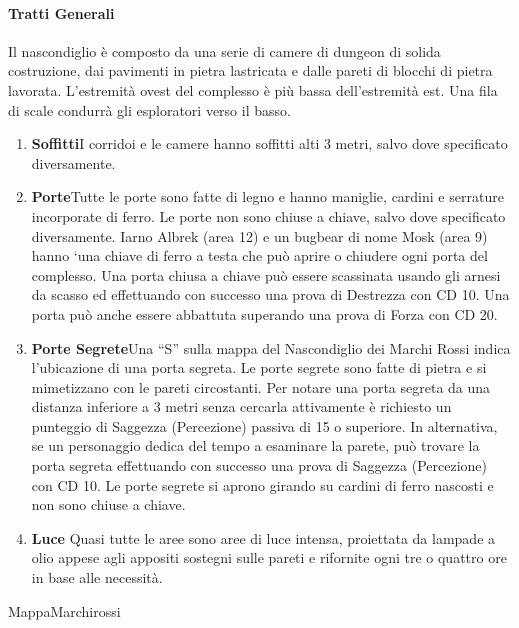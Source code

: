 \documentclass{article}
\begin{document}
\paragraph{Tratti Generali}
\hypertarget{trattigen}{}
Il nascondiglio è composto da una serie di camere di dungeon
di solida costruzione, dai pavimenti in pietra lastricata e
dalle pareti di blocchi di pietra lavorata. L'estremità ovest
del complesso è più bassa dell’estremità est. Una fila di scale
condurrà gli esploratori verso il basso.
\begin{enumerate}
    \item \textbf{Soffitti}I corridoi e le camere hanno soffitti alti 3 metri,
salvo dove specificato diversamente.
    \item \textbf{Porte}Tutte le porte sono fatte di legno e hanno maniglie,
cardini e serrature incorporate di ferro. Le porte non sono
chiuse a chiave, salvo dove specificato diversamente. Iarno
Albrek (area 12) e un bugbear di nome Mosk (area 9) hanno
‘una chiave di ferro a testa che può aprire o chiudere ogni
porta del complesso.
Una porta chiusa a chiave può essere scassinata usando
gli arnesi da scasso ed effettuando con successo una prova di
Destrezza con CD 10. Una porta può anche essere abbattuta
superando una prova di Forza con CD 20.
\item \textbf{Porte Segrete}Una “S” sulla mappa del Nascondiglio dei
Marchi Rossi indica l'ubicazione di una porta segreta.
Le porte segrete sono fatte di pietra e si mimetizzano con
le pareti circostanti. Per notare una porta segreta da una
distanza inferiore a 3 metri senza cercarla attivamente è
richiesto un punteggio di Saggezza (Percezione) passiva di
15 o superiore. In alternativa, se un personaggio dedica del
tempo a esaminare la parete, può trovare la porta segreta
effettuando con successo una prova di Saggezza (Percezione)
con CD 10. Le porte segrete si aprono girando su cardini di
ferro nascosti e non sono chiuse a chiave.
\item \textbf{Luce} Quasi tutte le aree sono aree di luce intensa, proiettata
da lampade a olio appese agli appositi sostegni sulle pareti e
rifornite ogni tre o quattro ore in base alle necessità.
\end{enumerate}
\hypertarget{MappaMarchirossi}{MappaMarchirossi}
\end{document}
